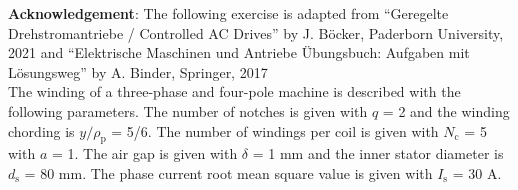 

\normalsize{\textbf{Acknowledgement}: The following exercise is adapted from ``Geregelte Drehstromantriebe / Controlled AC Drives'' by J. Böcker, Paderborn University, 2021 and 
``Elektrische Maschinen und Antriebe Übungsbuch: Aufgaben mit Lösungsweg'' by A. Binder, Springer, 2017
}\\




The winding of a three-phase and four-pole machine is described with the following parameters. The number of notches is given with $q$ = 2 and the winding chording is $y/\rho_{\mathrm{p}}$ = 5/6. The number of windings per coil is given with $N_{\mathrm{c}}$ = 5 with $a$ = 1. The air gap is given with $\delta$ = 1 mm and the inner stator diameter is $d_{\mathrm{s}}$ = 80 mm. The phase current root mean square value is given with $I_{\mathrm{s}}$ = 30  A.


